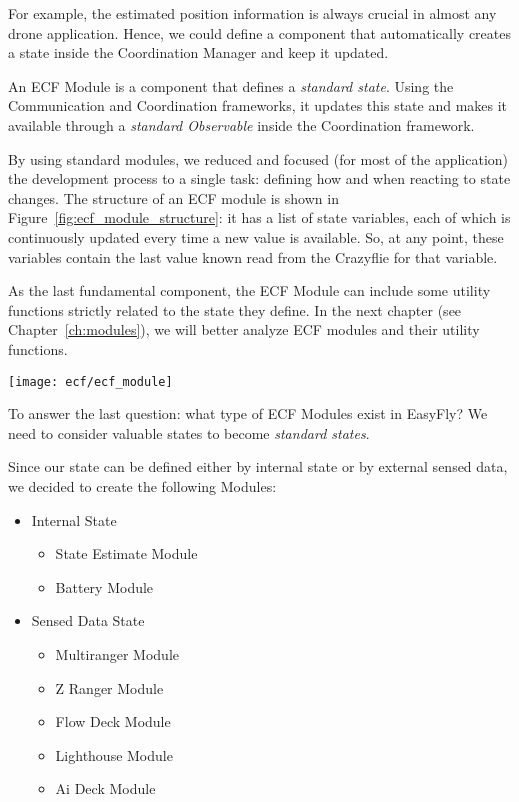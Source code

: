 For example, the estimated position information is always crucial in almost any drone application. 
Hence, we could define a component that automatically creates a state inside the Coordination Manager and keep it updated.

An ECF Module is a component that defines a \textit{standard state}.
Using the Communication and Coordination frameworks, it updates this state and makes it available through a \textit{standard Observable} inside the Coordination framework.

By using standard modules, we reduced and focused (for most of the application) the development process to a single task: defining how and when reacting to state changes.
The structure of an ECF module is shown in Figure~\ref{fig:ecf_module_structure}: it has a list of state variables, each of which is continuously updated every time a new value is available. 
So, at any point, these variables contain the last value known read from the Crazyflie for that variable.

As the last fundamental component, the ECF Module can include some utility functions strictly related to the state they define. 
In the next chapter (see Chapter~\ref{ch:modules}), we will better analyze ECF modules and their utility functions.

\begin{SCfigure}[\sidecaptionrelwidth][h]
    \texttt{[image: ecf/ecf\_module]}
    \caption{Extended Craziflie Module internal structure}\label{fig:ecf_module_structure}
\end{SCfigure}

To answer the last question: what type of ECF Modules exist in EasyFly? 
We need to consider valuable states to become \textit{standard states}.

Since our state can be defined either by internal state or by external sensed data, we decided to create the following Modules:
\begin{itemize}
    \item Internal State
    \begin{itemize}
        \item State Estimate Module
        \item Battery Module
    \end{itemize}
    
    \item Sensed Data State
    \begin{itemize}
        \item Multiranger Module
        \item Z Ranger Module
        \item Flow Deck Module
        \item Lighthouse Module
        \item Ai Deck Module
    \end{itemize}
\end{itemize}


